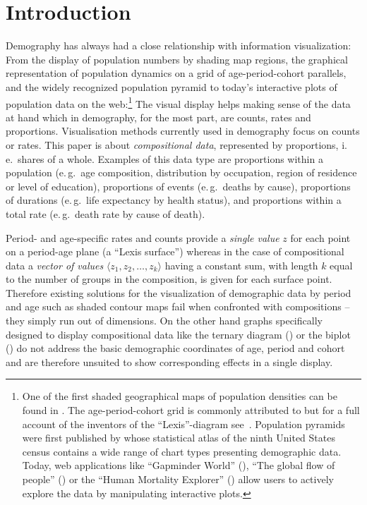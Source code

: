 \documentclass[parskip=half]{scrartcl}
\begin{document}
\section{Introduction} %
\label{sec:intro}

\noindent Demography has always had a close relationship with information visualization: From the display of population numbers by shading map regions, the graphical representation of population dynamics on a grid of age-period-cohort parallels, and the widely recognized population pyramid to today's interactive plots of population data on the web:\footnote{
  One of the first shaded geographical maps of population densities can be found in \textcite{Dangeville1836}. The age-period-cohort grid is commonly attributed to \textcite{Lexis1875} but for a full account of the inventors of the \enquote{Lexis}-diagram see~\textcite{Vandeschrick2001}. Population pyramids were first published by \textcite{Walker1874} whose statistical atlas of the ninth United States census contains a wide range of chart types presenting demographic data. Today, web applications like \enquote{Gapminder World} (\cite{Rosling2006}), \enquote{The global flow of people} (\cite{Abel2014}) or the \enquote{Human Mortality Explorer} (\cite{Schoeley2016}) allow users to actively explore the data by manipulating interactive plots.
}
The visual display helps making sense of the data at hand which in demography, for the most part, are counts, rates and proportions. Visualisation methods currently used in demography focus on counts or rates. This paper is about \emph{compositional data}, represented by proportions, i.\,e.~shares of a whole. Examples of this data type are proportions within a population (e.\,g.~age composition, distribution by occupation, region of residence or level of education), proportions of events (e.\,g.~deaths by cause), proportions of durations (e.\,g.~life expectancy by health status), and proportions within a total rate (e.\,g.~death rate by cause of death).

Period- and age-specific rates and counts provide a \emph{single value} $z$ for each point on a period-age plane (a \enquote{Lexis surface}) whereas in the case of compositional data a \emph{vector of values} $\langle z_1, z_2, \ldots, z_k \rangle$ having a constant sum, with length $k$ equal to the number of groups in the composition, is given for each surface point. Therefore existing solutions for the visualization of demographic data by period and age such as shaded contour maps fail when confronted with compositions -- they simply run out of dimensions. On the other hand graphs specifically designed to display compositional data like the ternary diagram (\cite{Aitchison1986}) or the biplot (\cite{Gabriel1971, Aitchison2002}) do not address the basic demographic coordinates of age, period and cohort and are therefore unsuited to show corresponding effects in a single display.
\end{document}
